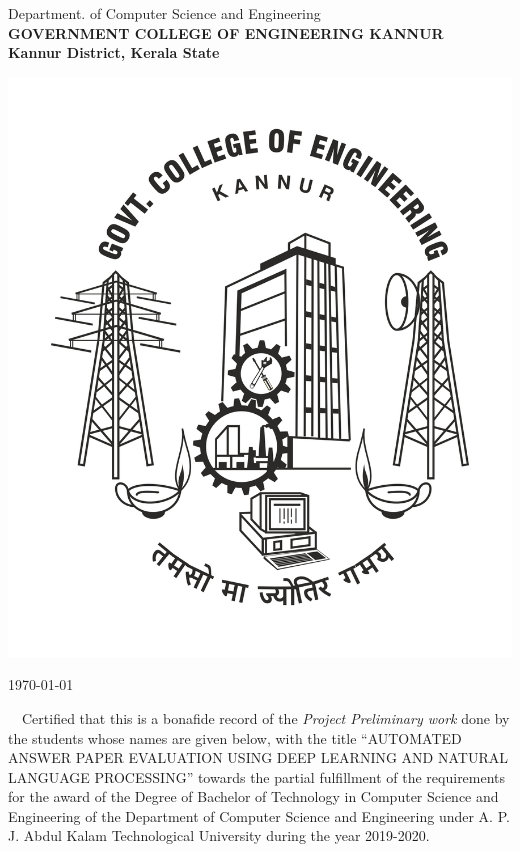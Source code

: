 \begin{center}
     { {\sc Department. of Computer Science and Engineering}}\\
     {\bf \MakeUppercase{Government College  of Engineering Kannur}}\\
     {\bf Kannur District, Kerala State}\\ \bigskip   
        
      \vspace*{25pt}
      \centerline{\includegraphics [keepaspectratio=true, scale=.2]{gcek.jpg}}
      \vspace*{2cm}
      \textbf{\large {}}
      \vspace*{1cm}     
\end{center}

\begin{flushright}
{\today}\\ \bigskip                                  
\end{flushright}

\jadafont
  {~~Certified that this  is a bonafide record of the 
  {\em Project Preliminary work} done by the students whose 
  names are given below, with the title 
  ``{{\sc \normalsize AUTOMATED ANSWER PAPER EVALUATION USING 
  DEEP LEARNING AND NATURAL LANGUAGE PROCESSING}}'' towards 
  the partial fulfillment of the 
  requirements for the award of the Degree of Bachelor of Technology in Computer Science and Engineering of the 
  Department of Computer Science and Engineering under A. P. J. Abdul Kalam Technological University
  during the year 2019-2020.
  }

